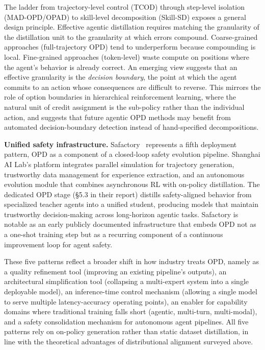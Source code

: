 \documentclass{article} %
\begin{document}
The ladder from trajectory-level control (TCOD) through step-level isolation (MAD-OPD/OPAD) to skill-level decomposition (Skill-SD) exposes a general design principle. Effective agentic distillation requires matching the granularity of the distillation unit to the granularity at which errors compound. Coarse-grained approaches (full-trajectory OPD) tend to underperform because compounding is local. Fine-grained approaches (token-level) waste compute on positions where the agent's behavior is already correct. An emerging view suggests that an effective granularity is the \emph{decision boundary}, the point at which the agent commits to an action whose consequences are difficult to reverse. This mirrors the role of option boundaries in hierarchical reinforcement learning, where the natural unit of credit assignment is the sub-policy rather than the individual action, and suggests that future agentic OPD methods may benefit from automated decision-boundary detection instead of hand-specified decompositions.

\textbf{Unified safety infrastructure.} Safactory~\citep{2605.06230} represents a fifth deployment pattern, OPD as a component of a closed-loop safety evolution pipeline. Shanghai AI Lab's platform integrates parallel simulation for trajectory generation, trustworthy data management for experience extraction, and an autonomous evolution module that combines asynchronous RL with on-policy distillation. The dedicated OPD stage (\S5.3 in their report) distills safety-aligned behavior from specialized teacher agents into a unified student, producing models that maintain trustworthy decision-making across long-horizon agentic tasks. Safactory is notable as an early publicly documented infrastructure that embeds OPD not as a one-shot training step but as a recurring component of a continuous improvement loop for agent safety.

These five patterns reflect a broader shift in how industry treats OPD, namely as a quality refinement tool (improving an existing pipeline's outputs), an architectural simplification tool (collapsing a multi-expert system into a single deployable model), an inference-time control mechanism (allowing a single model to serve multiple latency-accuracy operating points), an enabler for capability domains where traditional training falls short (agentic, multi-turn, multi-modal), and a safety consolidation mechanism for autonomous agent pipelines. All five patterns rely on on-policy generation rather than static dataset distillation, in line with the theoretical advantages of distributional alignment surveyed above.
\end{document}
